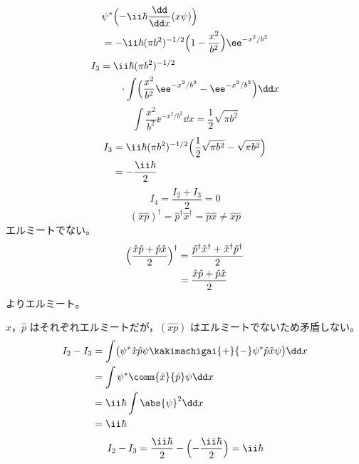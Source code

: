 \begin{align*}
&\psi^{*}\Bigl(-\ii\hbar\frac{\dd}{\dd x}(x\psi)\Bigr)\\
&=-\ii\hbar(\pi b^{2})^{-1/2}\Bigl(1-\frac{x^{2}}{b^{2}}\Bigr)\ee^{-x^{2}/b^{2}}
\end{align*}
\begin{align*}
I_{3}&=\ii\hbar(\pi b^{2})^{-1/2}\\
&\qquad\cdot\int\Bigl(\frac{x^{2}}{b^{2}}\ee^{-x^{2}/b^{2}}-\ee^{-x^{2}/b^{2}}\Bigr)\dd x
\end{align*}
\[ \int\frac{x^{2}}{b^{2}}\ee^{-x^{2}/b^{2}}\dd x=\frac{1}{2}\sqrt{\pi b^{2}} \]
\begin{align*}
I_{3}&=\ii\hbar(\pi b^{2})^{-1/2}\Bigl(\frac{1}{2}\sqrt{\pi b^{2}}-\sqrt{\pi b^{2}}\Bigr)\\
&=-\frac{\ii\hbar}{2}
\end{align*}
\[ I_{4}=\frac{I_{2}+I_{3}}{2}=0 \]
\[ (\hat{x}\hat{p})^{\dagger}=\hat{p}^{\dagger}\hat{x}^{\dagger}=\hat{p}\hat{x}\neq\hat{x}\hat{p} \]
エルミートでない。
\begin{align*}
\Bigl(\frac{\hat{x}\hat{p}+\hat{p}\hat{x}}{2}\Bigr)^{\dagger}
&=\frac{\hat{p}^{\dagger}\hat{x}^{\dagger}+\hat{x}^{\dagger}\hat{p}^{\dagger}}{2}\\
&=\frac{\hat{x}\hat{p}+\hat{p}\hat{x}}{2}
\end{align*}
よりエルミート。

$\hat{x}$，$\hat{p}$ はそれぞれエルミートだが，$(\hat{x}\hat{p})$ はエルミートでないため矛盾しない。
\begin{align*}
I_{2}-I_{3}&=\int\bigl(\psi^{*}\hat{x}\hat{p}\psi\kakimachigai{+}{-}\psi^{*}\hat{p}\hat{x}\psi\bigr)\dd x\\
&=\int\psi^{*}\comm{\hat{x}}{\hat{p}}\psi\dd x\\
&=\ii\hbar\int\abs{\psi}^{2}\dd x\\
&=\ii\hbar
\end{align*}
\[ I_{2}-I_{3}=\frac{\ii\hbar}{2}-\Bigl(-\frac{\ii\hbar}{2}\Bigr)=\ii\hbar \]
